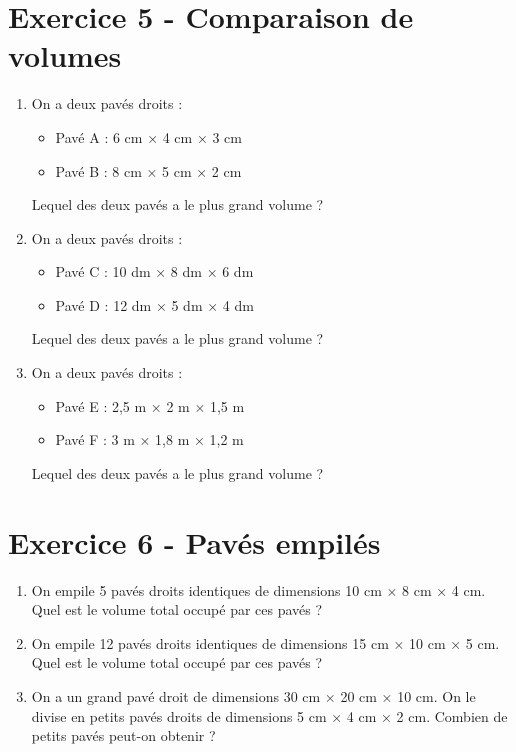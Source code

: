 \documentclass[12pt, a4paper]{article}
\begin{document}
\section*{Exercice 5 - Comparaison de volumes}
\begin{enumerate}[label=\textbf{\arabic*.}]
    \item On a deux pavés droits :
    \begin{itemize}
        \item Pavé A : 6 cm × 4 cm × 3 cm
        \item Pavé B : 8 cm × 5 cm × 2 cm
    \end{itemize}
    Lequel des deux pavés a le plus grand volume ?
    
    \item On a deux pavés droits :
    \begin{itemize}
        \item Pavé C : 10 dm × 8 dm × 6 dm
        \item Pavé D : 12 dm × 5 dm × 4 dm
    \end{itemize}
    Lequel des deux pavés a le plus grand volume ?
    
    \item On a deux pavés droits :
    \begin{itemize}
        \item Pavé E : 2,5 m × 2 m × 1,5 m
        \item Pavé F : 3 m × 1,8 m × 1,2 m
    \end{itemize}
    Lequel des deux pavés a le plus grand volume ?
\end{enumerate}

\section*{Exercice 6 - Pavés empilés}
\begin{enumerate}[label=\textbf{\arabic*.}]
    \item On empile 5 pavés droits identiques de dimensions 10 cm × 8 cm × 4 cm. Quel est le volume total occupé par ces pavés ?
    \item On empile 12 pavés droits identiques de dimensions 15 cm × 10 cm × 5 cm. Quel est le volume total occupé par ces pavés ?
    \item On a un grand pavé droit de dimensions 30 cm × 20 cm × 10 cm. On le divise en petits pavés droits de dimensions 5 cm × 4 cm × 2 cm. Combien de petits pavés peut-on obtenir ?
\end{enumerate}
\end{document}

